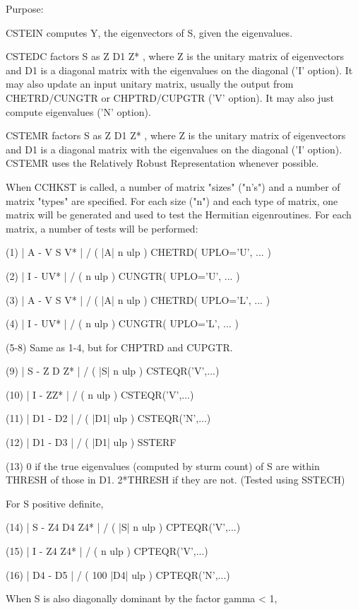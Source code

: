 \begin{DoxyParagraph}{Purpose\+: }
\begin{DoxyVerb}
    CSTEIN computes Y, the eigenvectors of S, given the
    eigenvalues.

    CSTEDC factors S as Z D1 Z* , where Z is the unitary
    matrix of eigenvectors and D1 is a diagonal matrix with
    the eigenvalues on the diagonal ('I' option). It may also
    update an input unitary matrix, usually the output
    from CHETRD/CUNGTR or CHPTRD/CUPGTR ('V' option). It may
    also just compute eigenvalues ('N' option).

    CSTEMR factors S as Z D1 Z* , where Z is the unitary
    matrix of eigenvectors and D1 is a diagonal matrix with
    the eigenvalues on the diagonal ('I' option).  CSTEMR
    uses the Relatively Robust Representation whenever possible.

 When CCHKST is called, a number of matrix "sizes" ("n's") and a
 number of matrix "types" are specified.  For each size ("n")
 and each type of matrix, one matrix will be generated and used
 to test the Hermitian eigenroutines.  For each matrix, a number
 of tests will be performed:

 (1)     | A - V S V* | / ( |A| n ulp ) CHETRD( UPLO='U', ... )

 (2)     | I - UV* | / ( n ulp )        CUNGTR( UPLO='U', ... )

 (3)     | A - V S V* | / ( |A| n ulp ) CHETRD( UPLO='L', ... )

 (4)     | I - UV* | / ( n ulp )        CUNGTR( UPLO='L', ... )

 (5-8)   Same as 1-4, but for CHPTRD and CUPGTR.

 (9)     | S - Z D Z* | / ( |S| n ulp ) CSTEQR('V',...)

 (10)    | I - ZZ* | / ( n ulp )        CSTEQR('V',...)

 (11)    | D1 - D2 | / ( |D1| ulp )        CSTEQR('N',...)

 (12)    | D1 - D3 | / ( |D1| ulp )        SSTERF

 (13)    0 if the true eigenvalues (computed by sturm count)
         of S are within THRESH of
         those in D1.  2*THRESH if they are not.  (Tested using
         SSTECH)

 For S positive definite,

 (14)    | S - Z4 D4 Z4* | / ( |S| n ulp ) CPTEQR('V',...)

 (15)    | I - Z4 Z4* | / ( n ulp )        CPTEQR('V',...)

 (16)    | D4 - D5 | / ( 100 |D4| ulp )       CPTEQR('N',...)

 When S is also diagonally dominant by the factor gamma < 1,


\end{DoxyVerb}
\end{DoxyParagraph}
